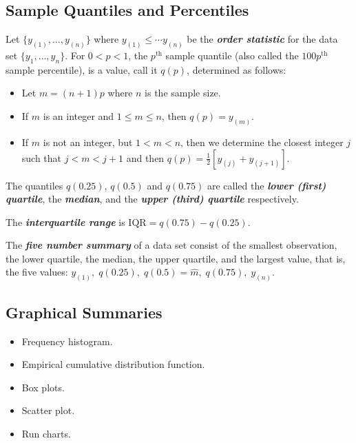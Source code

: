 \subsection*{Sample Quantiles and Percentiles}
\begin{Definition}{}{}
    Let $ \{y_{(1)},\ldots ,y_{(n)}\} $ where $ y_{(1)}\leqslant \cdots y_{(n)} $
    be the \textbf{\emph{order statistic}} for the data set $ \{y_1,\ldots ,y_n\} $.
    For $ 0<p<1 $, the $ p^{\text{th}} $ sample quantile (also called the $ 100p^{\text{th}} $
    sample percentile), is a value, call it $ q(p) $, determined as follows:
    \begin{itemize}
        \item Let $ m=(n+1)p $ where $ n $ is the sample size.
        \item If $ m $ is an integer and $ 1\leqslant m\leqslant n $, then $ q(p)=y_{(m)} $.
        \item If $ m $ is not an integer, but $ 1<m<n $, then we determine the closest integer $ j $ such
              that $ j < m < j+1 $ and then $ q(p)=\frac{1}{2} \left[ y_{(j)}+y_{(j+1)} \right] $.
    \end{itemize}
\end{Definition}



\begin{Definition}{}{}
    The quantiles $ q(0.25) $, $ q(0.5) $ and $ q(0.75) $ are called the
    \textbf{\emph{lower (first) quartile}}, the \textbf{\emph{median}},
    and the \textbf{\emph{upper (third) quartile}} respectively.
\end{Definition}



\begin{Definition}{}{}
    The \textbf{\emph{interquartile range}} is $ \text{IQR}=q(0.75)-q(0.25) $.
\end{Definition}



\begin{Definition}{}{}
    The \textbf{\emph{five number summary}} of a data set consist of the smallest observation,
    the lower quartile, the median, the upper quartile, and the largest value, that is,
    the five values: $ y_{(1)},\;q(0.25),\;q(0.5)=\hat{m},\;q(0.75),\;y_{(n)} $.
\end{Definition}


\subsection*{Graphical Summaries}
\begin{itemize}
    \item Frequency histogram.
    \item Empirical cumulative distribution function.
    \item Box plots.
    \item Scatter plot.
    \item Run charts.
\end{itemize}

